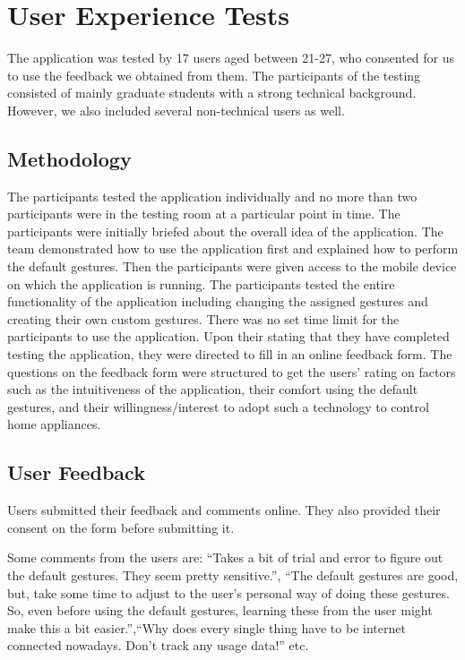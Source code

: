 \documentclass[journal]{IEEEtran}
\begin{document}
 

\section{User Experience Tests}

The application was tested by 17 users aged between 21-27, who consented for us to use the feedback we obtained from them. The participants of the testing consisted of mainly graduate students with a strong technical background. However, we also included several non-technical users as well.

\subsection{Methodology}

The participants tested the application individually and no more than two participants were in the testing room at a particular point in time. The participants were initially briefed about the overall idea of the application. The team demonstrated how to use the application first and explained how to perform the default gestures. Then the participants were given access to the mobile device on which the application is running. The participants tested the entire functionality of the application including changing the assigned gestures and creating their own custom gestures. There was no set time limit for the participants to use the application. Upon their stating that they have completed testing the application, they were directed to fill in an online feedback form. The questions on the feedback form were structured to get the users' rating on factors such as the intuitiveness of the application, their comfort using the default gestures, and their willingness/interest to adopt such a technology to control home appliances.
\subsection{User Feedback}

Users submitted their feedback and comments online. They also provided their consent on the form before submitting it.

Some comments from the users are: ``Takes a bit of trial and error to figure out the default gestures. They seem pretty sensitive.'', ``The default gestures are good, but, take some time to adjust to the user's personal way of doing these gestures. So, even before using the default gestures, learning  these from the user might make this a bit easier.'',``Why does every single thing have to be internet connected nowadays. Don't track any usage data!'' etc. 
\end{document}
